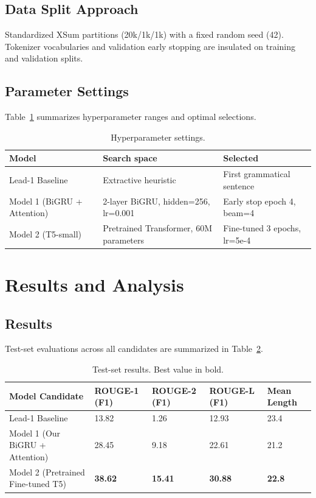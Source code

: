 \documentclass[conference]{IEEEtran}
\begin{document}
\subsection{Data Split Approach}
Standardized XSum partitions (20k/1k/1k) with a fixed random seed (42). Tokenizer vocabularies and validation early stopping are insulated on training and validation splits.

\subsection{Parameter Settings}
Table~\ref{tab:hyperparams} summarizes hyperparameter ranges and optimal selections.

\begin{table}[htbp]
\caption{Hyperparameter settings.}
\label{tab:hyperparams}
\centering
\begin{tabular}{lll}
\toprule
\textbf{Model} & \textbf{Search space} & \textbf{Selected} \\
\midrule
Lead-1 Baseline & Extractive heuristic & First grammatical sentence \\
Model 1 (BiGRU + Attention) & 2-layer BiGRU, hidden=256, lr=0.001 & Early stop epoch 4, beam=4 \\
Model 2 (T5-small) & Pretrained Transformer, 60M parameters & Fine-tuned 3 epochs, lr=5e-4 \\
\bottomrule
\end{tabular}
\end{table}

\section{Results and Analysis}
\subsection{Results}
Test-set evaluations across all candidates are summarized in Table~\ref{tab:results}.

\begin{table}[htbp]
\caption{Test-set results. Best value in bold.}
\label{tab:results}
\centering
\begin{tabular}{lllll}
\toprule
\textbf{Model Candidate} & \textbf{ROUGE-1 (F1)} & \textbf{ROUGE-2 (F1)} & \textbf{ROUGE-L (F1)} & \textbf{Mean Length} \\
\midrule
Lead-1 Baseline & 13.82 & 1.26 & 12.93 & 23.4 \\
Model 1 (Our BiGRU + Attention) & 28.45 & 9.18 & 22.61 & 21.2 \\
Model 2 (Pretrained Fine-tuned T5) & \textbf{38.62} & \textbf{15.41} & \textbf{30.88} & \textbf{22.8} \\
\bottomrule
\end{tabular}
\end{table}
\end{document}
